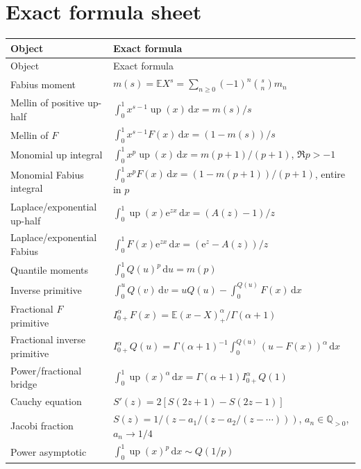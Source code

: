 \documentclass[11pt,oneside]{article}
\numberwithin{equation}{section}
\theoremstyle{definition}
\theoremstyle{remark}
\newcommand{\Up}{\operatorname{up}}
\newcommand{\e}{\mathrm e}
\newcommand{\dd}{\,\mathrm d}
\newcommand{\E}{\mathbb E}
\newcommand{\QF}{Q}
\begin{document}
\appendix

\section{Exact formula sheet}
\label{app:formula-sheet}

\begin{longtable}{@{}p{}p{}@{}}
\toprule
Object & Exact formula \\
\midrule
\endfirsthead
\toprule
Object & Exact formula \\
\midrule
\endhead
Fabius moment
& \(m(s)=\E X^s=\sum_{n\ge0}(-1)^n\binom{s}{n}m_n\) \\
Mellin of positive up-half
& \(\int_0^1x^{s-1}\Up(x)\dd x=m(s)/s\) \\
Mellin of \(F\)
& \(\int_0^1x^{s-1}F(x)\dd x=(1-m(s))/s\) \\
Monomial up integral
& \(\int_0^1x^p\Up(x)\dd x=m(p+1)/(p+1)\), \(\Re p>-1\) \\
Monomial Fabius integral
& \(\int_0^1x^pF(x)\dd x=(1-m(p+1))/(p+1)\), entire in \(p\) \\
Laplace/exponential up-half
& \(\int_0^1\Up(x)\e^{zx}\dd x=(A(z)-1)/z\) \\
Laplace/exponential Fabius
& \(\int_0^1F(x)\e^{zx}\dd x=(\e^z-A(z))/z\) \\
Quantile moments
& \(\int_0^1\QF(u)^p\dd u=m(p)\) \\
Inverse primitive
& \(\int_0^u\QF(v)\dd v=u\QF(u)-\int_0^{\QF(u)}F(x)\dd x\) \\
Fractional \(F\) primitive
& \(I_{0+}^{\alpha}F(x)=\E(x-X)_+^\alpha/\Gamma(\alpha+1)\) \\
Fractional inverse primitive
& \(I_{0+}^{\alpha}\QF(u)=\Gamma(\alpha+1)^{-1}\int_0^{\QF(u)}(u-F(x))^\alpha\dd x\) \\
Power/fractional bridge
& \(\int_0^1\Up(x)^\alpha\dd x=\Gamma(\alpha+1)I_{0+}^{\alpha}\QF(1)\) \\
Cauchy equation
& \(S'(z)=2[S(2z+1)-S(2z-1)]\) \\
Jacobi fraction
& \(S(z)=1/(z-a_1/(z-a_2/(z-\cdots)))\), \(a_n\in\mathbb Q_{>0}\), \(a_n\to1/4\) \\
Power asymptotic
& \(\int_0^1\Up(x)^p\dd x\sim\QF(1/p)\) \\
\bottomrule
\end{longtable}

\end{document}
